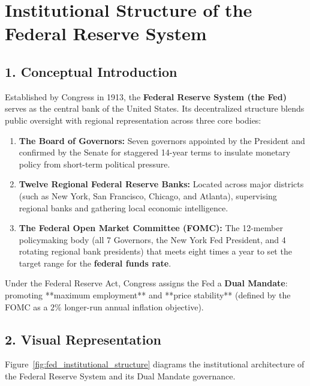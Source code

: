 \documentclass[11pt,letterpaper]{article}
\begin{document}
\section{Institutional Structure of the Federal Reserve System}

\subsection*{1. Conceptual Introduction}
Established by Congress in 1913, the \textbf{Federal Reserve System (the Fed)} serves as the central bank of the United States. Its decentralized structure blends public oversight with regional representation across three core bodies:
\begin{enumerate}
    \item \textbf{The Board of Governors:} Seven governors appointed by the President and confirmed by the Senate for staggered 14-year terms to insulate monetary policy from short-term political pressure.
    \item \textbf{Twelve Regional Federal Reserve Banks:} Located across major districts (such as New York, San Francisco, Chicago, and Atlanta), supervising regional banks and gathering local economic intelligence.
    \item \textbf{The Federal Open Market Committee (FOMC):} The 12-member policymaking body (all 7 Governors, the New York Fed President, and 4 rotating regional bank presidents) that meets eight times a year to set the target range for the \textbf{federal funds rate}.
\end{enumerate}
Under the Federal Reserve Act, Congress assigns the Fed a \textbf{Dual Mandate}: promoting **maximum employment** and **price stability** (defined by the FOMC as a $2\%$ longer-run annual inflation objective).

\subsection*{2. Visual Representation}
Figure~\ref{fig:fed_institutional_structure} diagrams the institutional architecture of the Federal Reserve System and its Dual Mandate governance.
\end{document}
